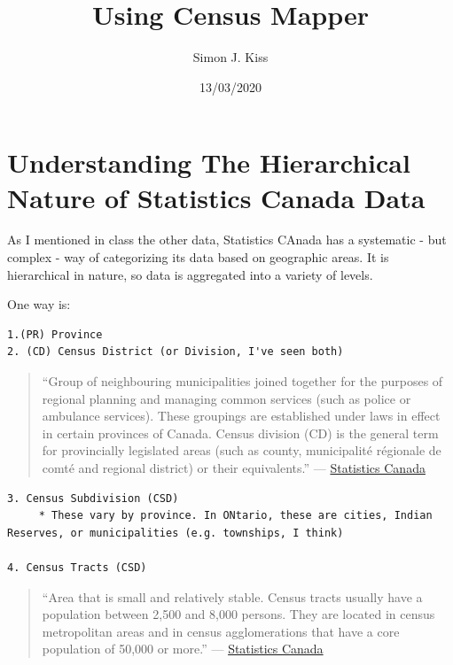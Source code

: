 \documentclass[
]{article}
\title{Using Census Mapper}
\author{Simon J. Kiss}
\date{13/03/2020}
\begin{document}
\maketitle

\hypertarget{understanding-the-hierarchical-nature-of-statistics-canada-data}{%
\section{Understanding The Hierarchical Nature of Statistics Canada
Data}\label{understanding-the-hierarchical-nature-of-statistics-canada-data}}

As I mentioned in class the other data, Statistics CAnada has a
systematic - but complex - way of categorizing its data based on
geographic areas. It is hierarchical in nature, so data is aggregated
into a variety of levels.

One way is:

\begin{verbatim}
1.(PR) Province
2. (CD) Census District (or Division, I've seen both) 
\end{verbatim}

\begin{quote}
``Group of neighbouring municipalities joined together for the purposes
of regional planning and managing common services (such as police or
ambulance services). These groupings are established under laws in
effect in certain provinces of Canada. Census division (CD) is the
general term for provincially legislated areas (such as county,
municipalité régionale de comté and regional district) or their
equivalents.'' \hfill ---
\href{https://www12.statcan.gc.ca/census-recensement/2016/ref/dict/geo008-eng.cfm}{Statistics
Canada}
\end{quote}

\begin{verbatim}
3. Census Subdivision (CSD)
     * These vary by province. In ONtario, these are cities, Indian Reserves, or municipalities (e.g. townships, I think)

4. Census Tracts (CSD)
\end{verbatim}

\begin{quote}
``Area that is small and relatively stable. Census tracts usually have a
population between 2,500 and 8,000 persons. They are located in census
metropolitan areas and in census agglomerations that have a core
population of 50,000 or more.'' \hfill ---
\href{https://www12.statcan.gc.ca/census-recensement/2011/ref/dict/geo013-eng.cfm}{Statistics
Canada}
\end{quote}
\end{document}
